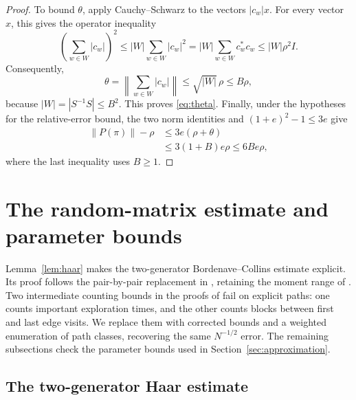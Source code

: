 \documentclass[11pt]{article}
\numberwithin{equation}{section}
\theoremstyle{boldremark}\newtheorem{remark}[theorem]{Remark}
\newcommand{\norm}[1]{\left\lVert #1\right\rVert}
\begin{document}
\begin{proof}
To bound $\theta$, apply Cauchy--Schwarz to the vectors $|c_w|x$.
For every vector $x$, this gives the operator inequality
\[
 \left(\sum_{w\in W}|c_w|\right)^2
 \le |W|\sum_{w\in W}|c_w|^2
 =|W|\sum_{w\in W}c_w^*c_w
 \le |W|\rho^2I.
\]
Consequently,
\[
 \theta=\left\|\sum_{w\in W}|c_w|\right\|
 \le\sqrt{|W|}\,\rho\le B\rho,
\]
because $|W|=|S^{-1}S|\le B^2$. This proves \eqref{eq:theta}.
Finally, under the hypotheses for the relative-error bound, the two
norm identities and $(1+e)^2-1\le3e$ give
\[
 \begin{aligned}
 \norm{P(\pi)}-\rho
 &\le3e(\rho+\theta)\\
 &\le3(1+B)e\rho\le6Be\rho,
 \end{aligned}
\]
where the last inequality uses $B\ge1$.
\end{proof}

\section{The random-matrix estimate and parameter bounds}
\label{app:finite-threshold}

Lemma~\ref{lem:haar} makes the two-generator Bordenave--Collins
estimate explicit. Its proof follows the pair-by-pair replacement
in \cite[Lemma~9.3]{BC}, retaining the moment range of
\cite[Theorem~5.1]{BC}. Two intermediate counting bounds in the
proofs of \cite[Lemmas~5.3 and~5.9]{BC} fail on explicit paths:
one counts important exploration times, and the other counts blocks
between first and last edge visits. We replace them with corrected
bounds and a weighted enumeration of path classes, recovering the
same $N^{-1/2}$ error. The remaining subsections check the parameter
bounds used in Section~\ref{sec:approximation}.

\subsection{The two-generator Haar estimate}
\end{document}
